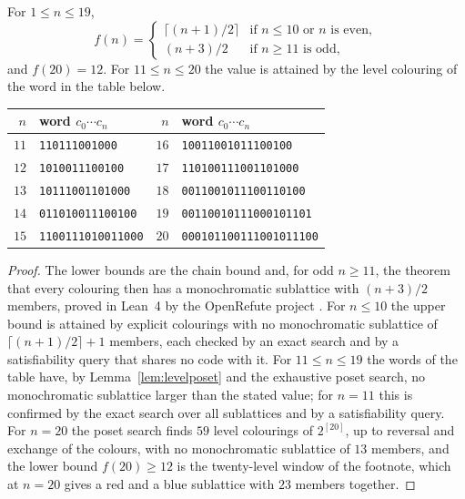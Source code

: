 \begin{theorem}\label{thm:fvalues}
For $1\le n\le 19$,
\[
f(n)=\begin{cases}\lceil (n+1)/2\rceil & \text{if } n\le 10 \text{ or } n \text{ is even},\\[2pt] (n+3)/2 & \text{if } n\ge 11 \text{ is odd},\end{cases}
\]
and $f(20)=12$. For $11\le n\le20$ the value is attained by the level colouring of the word in the table below.
\begin{center}\small
\begin{tabular}{@{}rl@{\qquad}rl@{}}
$n$ & word $c_{0}\cdots c_{n}$ & $n$ & word $c_{0}\cdots c_{n}$\\
\midrule
$11$ & \texttt{110111001000} & $16$ & \texttt{10011001011100100}\\
$12$ & \texttt{1010011100100} & $17$ & \texttt{110100111001101000}\\
$13$ & \texttt{10111001101000} & $18$ & \texttt{0011001011100110100}\\
$14$ & \texttt{011010011100100} & $19$ & \texttt{00110010111000101101}\\
$15$ & \texttt{1100111010011000} & $20$ & \texttt{000101100111001011100}
\end{tabular}
\end{center}
\end{theorem}

\begin{proof}
The lower bounds are the chain bound and, for odd $n\ge11$, the theorem that every colouring then has a monochromatic sublattice with $(n+3)/2$ members, proved in Lean~4 by the OpenRefute project \cite{ORf1183}. For $n\le10$ the upper bound is attained by explicit colourings with no monochromatic sublattice of $\lceil(n+1)/2\rceil+1$ members, each checked by an exact search and by a satisfiability query that shares no code with it. For $11\le n\le19$ the words of the table have, by Lemma~\ref{lem:levelposet} and the exhaustive poset search, no monochromatic sublattice larger than the stated value; for $n=11$ this is confirmed by the exact search over all sublattices and by a satisfiability query. For $n=20$ the poset search finds $59$ level colourings of $2^{[20]}$, up to reversal and exchange of the colours, with no monochromatic sublattice of $13$ members, and the lower bound $f(20)\ge12$ is the twenty-level window of the footnote, which at $n=20$ gives a red and a blue sublattice with $23$ members together.
\end{proof}

